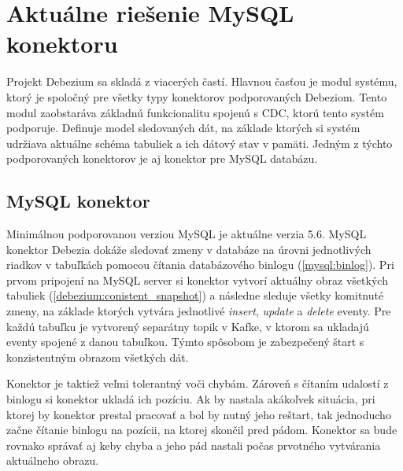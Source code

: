 \chapter{Aktuálne riešenie MySQL konektoru}
Projekt Debezium sa skladá z viacerých častí. Hlavnou časťou je modul systému, ktorý je spoločný pre všetky typy konektorov podporovaných Debeziom. Tento modul zaobstaráva základnú funkcionalitu spojenú s CDC, ktorú tento systém podporuje. Definuje model sledovaných dát, na základe ktorých si systém udržiava aktuálne schéma tabuliek a ich dátový stav v pamäti. Jedným z týchto podporovaných konektorov je aj konektor pre MySQL databázu.

\section{MySQL konektor}\label{debezium:mysql_connector}
Minimálnou podporovanou verziou MySQL je aktuálne verzia 5.6. MySQL konektor Debezia dokáže sledovať zmeny v databáze na úrovni jednotlivých riadkov v tabuľkách pomocou čítania databázového binlogu (\ref{mysql:binlog}). Pri prvom pripojení na MySQL server si konektor vytvorí aktuálny obraz všetkých tabuliek (\ref{debezium:conistent_snapshot}) a následne sleduje všetky komitnuté zmeny, na základe ktorých vytvára jednotlivé \textit{insert}, \textit{update} a \textit{delete} eventy. Pre každú tabuľku je vytvorený separátny topik v Kafke, v ktorom sa ukladajú eventy spojené z danou tabuľkou. Týmto spôsobom je zabezpečený štart s konzistentným obrazom všetkých dát.

Konektor je taktiež veľmi tolerantný voči chybám. Zároveň s čítaním udalostí z binlogu si konektor ukladá ich pozíciu. Ak by nastala akákoľvek situácia, pri ktorej by konektor prestal pracovať a bol by nutný jeho reštart, tak jednoducho začne čítanie binlogu na pozícii, na ktorej skončil pred pádom. Konektor sa bude rovnako správať aj keby chyba a jeho pád nastali počas prvotného vytvárania aktuálneho obrazu.


